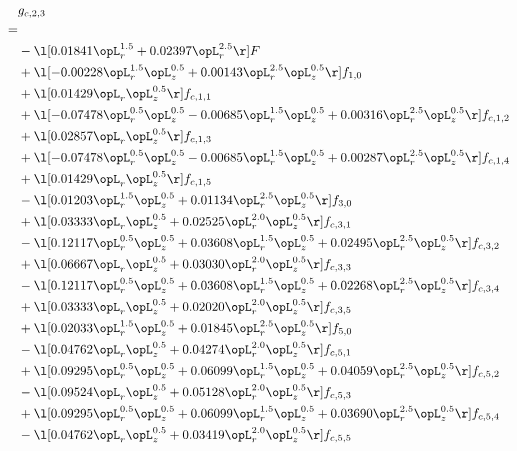 \begin{alignat}{2} 
\label{eq:g_23_0} 
& g_{c,2,3} \nonumber \\ 
 = \\ 
& - \l[  0.01841 \opL_r^{1.5} +  0.02397 \opL_r^{2.5}  \r] F \nonumber \\ 
& + \l[  -0.00228 \opL_r^{1.5} \opL_z^{0.5} +  0.00143 \opL_r^{2.5} \opL_z^{0.5}  \r] f_{1,0} \nonumber \\ 
& + \l[  0.01429 \opL_r \opL_z^{0.5}  \r] f_{c,1,1} \nonumber \\ 
& + \l[  -0.07478 \opL_r^{0.5} \opL_z^{0.5}   -0.00685 \opL_r^{1.5} \opL_z^{0.5} +  0.00316 \opL_r^{2.5} \opL_z^{0.5}  \r] f_{c,1,2} \nonumber \\ 
& + \l[  0.02857 \opL_r \opL_z^{0.5}  \r] f_{c,1,3} \nonumber \\ 
& + \l[  -0.07478 \opL_r^{0.5} \opL_z^{0.5}   -0.00685 \opL_r^{1.5} \opL_z^{0.5} +  0.00287 \opL_r^{2.5} \opL_z^{0.5}  \r] f_{c,1,4} \nonumber \\ 
& + \l[  0.01429 \opL_r \opL_z^{0.5}  \r] f_{c,1,5} \nonumber \\ 
& - \l[  0.01203 \opL_r^{1.5} \opL_z^{0.5} +  0.01134 \opL_r^{2.5} \opL_z^{0.5}  \r] f_{3,0} \nonumber \\ 
& + \l[  0.03333 \opL_r \opL_z^{0.5} +  0.02525 \opL_r^{2.0} \opL_z^{0.5}  \r] f_{c,3,1} \nonumber \\ 
& - \l[  0.12117 \opL_r^{0.5} \opL_z^{0.5} +  0.03608 \opL_r^{1.5} \opL_z^{0.5} +  0.02495 \opL_r^{2.5} \opL_z^{0.5}  \r] f_{c,3,2} \nonumber \\ 
& + \l[  0.06667 \opL_r \opL_z^{0.5} +  0.03030 \opL_r^{2.0} \opL_z^{0.5}  \r] f_{c,3,3} \nonumber \\ 
& - \l[  0.12117 \opL_r^{0.5} \opL_z^{0.5} +  0.03608 \opL_r^{1.5} \opL_z^{0.5} +  0.02268 \opL_r^{2.5} \opL_z^{0.5}  \r] f_{c,3,4} \nonumber \\ 
& + \l[  0.03333 \opL_r \opL_z^{0.5} +  0.02020 \opL_r^{2.0} \opL_z^{0.5}  \r] f_{c,3,5} \nonumber \\ 
& + \l[  0.02033 \opL_r^{1.5} \opL_z^{0.5} +  0.01845 \opL_r^{2.5} \opL_z^{0.5}  \r] f_{5,0} \nonumber \\ 
& - \l[  0.04762 \opL_r \opL_z^{0.5} +  0.04274 \opL_r^{2.0} \opL_z^{0.5}  \r] f_{c,5,1} \nonumber \\ 
& + \l[  0.09295 \opL_r^{0.5} \opL_z^{0.5} +  0.06099 \opL_r^{1.5} \opL_z^{0.5} +  0.04059 \opL_r^{2.5} \opL_z^{0.5}  \r] f_{c,5,2} \nonumber \\ 
& - \l[  0.09524 \opL_r \opL_z^{0.5} +  0.05128 \opL_r^{2.0} \opL_z^{0.5}  \r] f_{c,5,3} \nonumber \\ 
& + \l[  0.09295 \opL_r^{0.5} \opL_z^{0.5} +  0.06099 \opL_r^{1.5} \opL_z^{0.5} +  0.03690 \opL_r^{2.5} \opL_z^{0.5}  \r] f_{c,5,4} \nonumber \\ 
& - \l[  0.04762 \opL_r \opL_z^{0.5} +  0.03419 \opL_r^{2.0} \opL_z^{0.5}  \r] f_{c,5,5} \nonumber \\ 
\end{alignat} 


